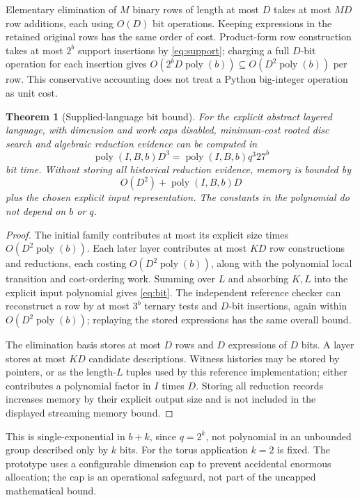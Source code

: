 \documentclass[11pt,letterpaper]{article}
\newtheorem{theorem}{Theorem}[section]
\theoremstyle{definition}
\newcommand{\poly}{\operatorname{poly}}
\begin{document}
Elementary elimination of $M$ binary rows of length at most $D$ takes at most $MD$ row additions, each using $O(D)$ bit operations. Keeping expressions in the retained original rows has the same order of cost. Product-form row construction takes at most $2^b$ support insertions by \eqref{eq:support}; charging a full $D$-bit operation for each insertion gives $O(2^b D\poly(b))\subseteq O(D^2\poly(b))$ per row. This conservative accounting does not treat a Python big-integer operation as unit cost.

\begin{theorem}[Supplied-language bit bound]\label{thm:complexity}
For the explicit abstract layered language, with dimension and work caps disabled, minimum-cost rooted disc search and algebraic reduction evidence can be computed in
\begin{equation}
 \poly(I,B,b)D^3=\poly(I,B,b)q^3 27^b\label{eq:bit}
\end{equation}
bit time. Without storing all historical reduction evidence, memory is bounded by
\begin{equation}
 O(D^2)+\poly(I,B,b)D
\end{equation}
plus the chosen explicit input representation. The constants in the polynomial do not depend on $b$ or $q$.
\end{theorem}
\begin{proof}
The initial family contributes at most its explicit size times $O(D^2\poly(b))$. Each later layer contributes at most $KD$ row constructions and reductions, each costing $O(D^2\poly(b))$, along with the polynomial local transition and cost-ordering work. Summing over $L$ and absorbing $K,L$ into the explicit input polynomial gives \eqref{eq:bit}. The independent reference checker can reconstruct a row by at most $3^b$ ternary tests and $D$-bit insertions, again within $O(D^2\poly(b))$; replaying the stored expressions has the same overall bound.

The elimination basis stores at most $D$ rows and $D$ expressions of $D$ bits. A layer stores at most $KD$ candidate descriptions. Witness histories may be stored by pointers, or as the length-$L$ tuples used by this reference implementation; either contributes a polynomial factor in $I$ times $D$. Storing all reduction records increases memory by their explicit output size and is not included in the displayed streaming memory bound.
\end{proof}

This is single-exponential in $b+k$, since $q=2^k$, not polynomial in an unbounded group described only by $k$ bits. For the torus application $k=2$ is fixed. The prototype uses a configurable dimension cap to prevent accidental enormous allocation; the cap is an operational safeguard, not part of the uncapped mathematical bound.
\end{document}
